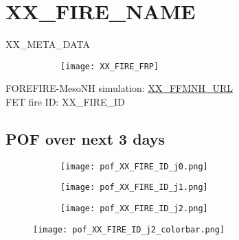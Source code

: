 \newpage
\vspace{-1em}
\section*{XX_FIRE_NAME}
\label{sec:fireIDXX_FIRE_ID}
\vspace{-1em}
\parbox{\linewidth}{\small{ XX_META_DATA}}
\begin{figure}[H]
    \centering
    \begin{subfigure}[b]{0.3\textwidth}
        \centering
    \end{subfigure}
    \begin{subfigure}[b]{0.69\textwidth}
        \centering
         \texttt{[image: XX\_FIRE\_FRP]}
    \end{subfigure}
\end{figure}
\vspace{-1em}
\noindent
\small{ FOREFIRE-MesoNH simulation:  \url{XX_FFMNH_URL} }\\
\noindent
\small{ FET fire ID: XX_FIRE_ID }
\vspace{-1em}
\subsection*{POF over next 3 days}
\vspace{-1em}
\begin{figure}[H]
    \raggedright  %
    \begin{minipage}{\textwidth}
        \begin{minipage}[t]{0.96\textwidth} %
            \begin{subfigure}[b]{0.32\textwidth}
                \centering
                \texttt{[image: pof\_XX\_FIRE\_ID\_j0.png]}
            \end{subfigure}
            \begin{subfigure}[b]{0.32\textwidth}
                \centering
                \texttt{[image: pof\_XX\_FIRE\_ID\_j1.png]}
            \end{subfigure}
            \begin{subfigure}[b]{0.32\textwidth}
                \centering
                \texttt{[image: pof\_XX\_FIRE\_ID\_j2.png]}
            \end{subfigure}
        \end{minipage}%
        \begin{minipage}[t]{0.0384\textwidth}
            \raggedright
            \texttt{[image: pof\_XX\_FIRE\_ID\_j2\_colorbar.png]}
        \end{minipage}
    \end{minipage}

\end{figure}


